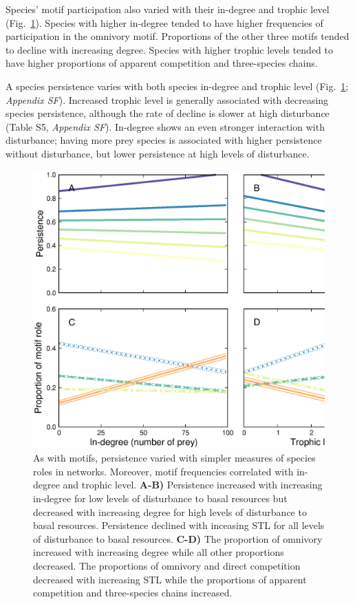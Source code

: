 \documentclass[12pt]{article}
\begin{document}
\begin{spacing}{2.0}
       Species' motif participation also varied with their in-degree and trophic level (Fig.~\ref{fig:motifs_vs_TL_and_deg}).
       Species with higher in-degree tended to have higher frequencies of participation in the omnivory motif. Proportions of the other three motifs tended to decline with increasing degree.
       Species with higher trophic levels tended to have higher proportions of apparent competition and three-species chains. 
        
       A species persistence varies with both species in-degree and trophic level (Fig.~\ref{fig:motifs_vs_TL_and_deg}; \emph{Appendix SF}). Increased trophic level is generally associated with decreasing species persistence, although the rate of decline is slower at high disturbance (Table S5, \emph{Appendix SF}).
       In-degree shows an even stronger interaction with disturbance; having more prey species is associated with higher persistence without disturbance, but lower persistence at high levels of disturbance.
        

            \begin{figure}
                \centering
                \includegraphics[width=\textwidth]{figures/roles_vs_TL.eps}
                \caption{As with motifs, persistence varied with simpler measures of species roles in networks. Moreover, motif frequencies correlated with in-degree and trophic level. \textbf{A-B)} Persistence increased with increasing in-degree for low levels of disturbance to basal resources but decreased with increasing degree for high levels of disturbance to basal resources.
                Persistence declined with inceasing STL for all levels of disturbance to basal resources.
                \textbf{C-D)} The proportion of omnivory increased with increasing degree while all other proportions decreased. The proportions of omnivory and direct competition decreased with increasing STL while the proportions of apparent competition and three-species chains increased.}
                \label{fig:motifs_vs_TL_and_deg}
            \end{figure}        
        

\end{spacing}
\end{document}
